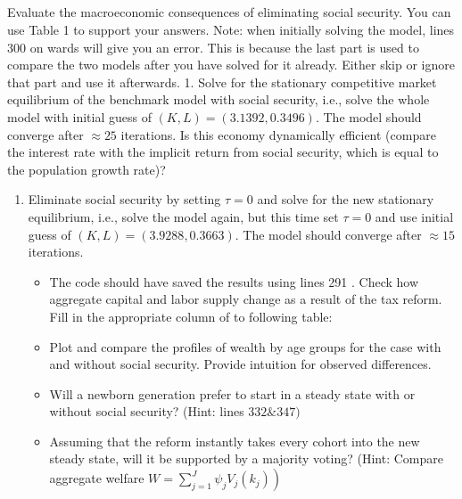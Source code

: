 \documentclass[10pt,notitlepage,onecolumn,aps,pra]{revtex4-1}
\begin{document}
    \begin{center}
    \end{center}
    { \hspace*{\fill} \\}
    
    \hypertarget{qquad}{%
\subsection{\texorpdfstring{\(\qquad\)}{\textbackslash qquad}}\label{qquad}}

Evaluate the macroeconomic consequences of eliminating social security.
You can use Table 1 to support your answers. Note: when initially
solving the model, lines 300 on wards will give you an error. This is
because the last part is used to compare the two models after you have
solved for it already. Either skip or ignore that part and use it
afterwards. 1. Solve for the stationary competitive market equilibrium
of the benchmark model with social security, i.e., solve the whole model
with initial guess of \((K, L)=(3.1392,0.3496) .\) The model should
converge after \(\approx 25\) iterations. Is this economy dynamically
efficient (compare the interest rate with the implicit return from
social security, which is equal to the population growth rate)?

    \begin{enumerate}
\def\labelenumi{\arabic{enumi}.}
\setcounter{enumi}{1}
\item
  Eliminate social security by setting \(\tau=0\) and solve for the new
  stationary equilibrium, i.e., solve the model again, but this time set
  \(\tau=0\) and use initial guess of \((K, L)=(3.9288,0.3663) .\) The
  model should converge after \(\approx 15\) iterations.

  \begin{itemize}
  \item
    The code should have saved the results using lines 291 . Check how
    aggregate capital and labor supply change as a result of the tax
    reform. Fill in the appropriate column of to following table:
  \item
    Plot and compare the profiles of wealth by age groups for the case
    with and without social security. Provide intuition for observed
    differences.
  \item
    Will a newborn generation prefer to start in a steady state with or
    without social security? (Hint: lines \(332 \& 347)\)
  \item
    Assuming that the reform instantly takes every cohort into the new
    steady state, will it be supported by a majority voting? (Hint:
    Compare aggregate welfare
    \(\left.W=\sum_{j=1}^{J} \psi_{j} V_{j}\left(k_{j}\right)\right)\)
  \end{itemize}
\end{enumerate}
\end{document}
